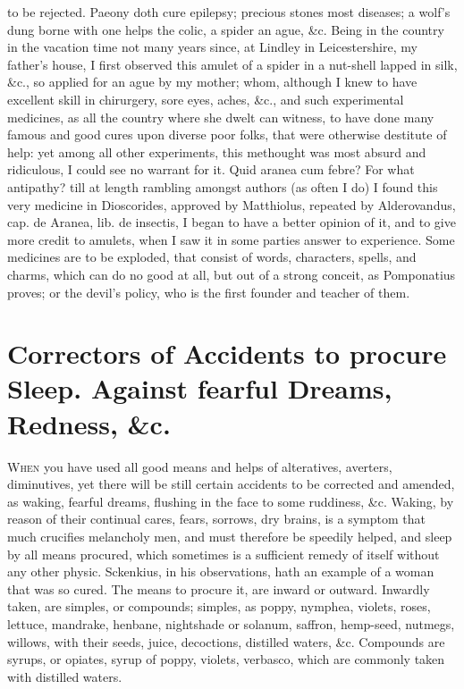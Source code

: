 to be rejected. Paeony doth cure epilepsy; precious stones most
diseases; a wolf's dung borne with one helps the colic, a
spider an ague, \&c. Being in the country in the vacation time not many
years since, at Lindley in Leicestershire, my father's house, I first
observed this amulet of a spider in a nut-shell lapped in silk, \&c., so
applied for an ague by my mother; whom, although I knew to have
excellent skill in chirurgery, sore eyes, aches, \&c., and such
experimental medicines, as all the country where she dwelt can witness,
to have done many famous and good cures upon diverse poor folks, that
were otherwise destitute of help: yet among all other experiments, this
methought was most absurd and ridiculous, I could see no warrant for
it. Quid aranea cum febre? For what antipathy? till at length rambling
amongst authors (as often I do) I found this very medicine in
Dioscorides, approved by Matthiolus, repeated by Alderovandus, cap. de
Aranea, lib. de insectis, I began to have a better opinion of it, and
to give more credit to amulets, when I saw it in some parties answer to
experience. Some medicines are to be exploded, that consist of words,
characters, spells, and charms, which can do no good at all, but out of
a strong conceit, as Pomponatius proves; or the devil's policy, who is
the first founder and teacher of them.

\section[Correctors for sleep]{Correctors of Accidents to procure Sleep. Against fearful Dreams, Redness, \&c.}

\lettrine{W}{hen} you have used all good means and helps of alteratives, averters,
diminutives, yet there will be still certain accidents to be corrected
and amended, as waking, fearful dreams, flushing in the face to some
ruddiness, \&c.
Waking, by reason of their continual cares, fears, sorrows, dry brains,
is a symptom that much crucifies melancholy men, and must therefore be
speedily helped, and sleep by all means procured, which sometimes is a
sufficient remedy of itself without any other physic. Sckenkius,
in his observations, hath an example of a woman that was so cured. The
means to procure it, are inward or outward. Inwardly taken, are
simples, or compounds; simples, as poppy, nymphea, violets, roses,
lettuce, mandrake, henbane, nightshade or solanum, saffron, hemp-seed,
nutmegs, willows, with their seeds, juice, decoctions, distilled
waters, \&c. Compounds are syrups, or opiates, syrup of poppy, violets,
verbasco, which are commonly taken with distilled waters.

